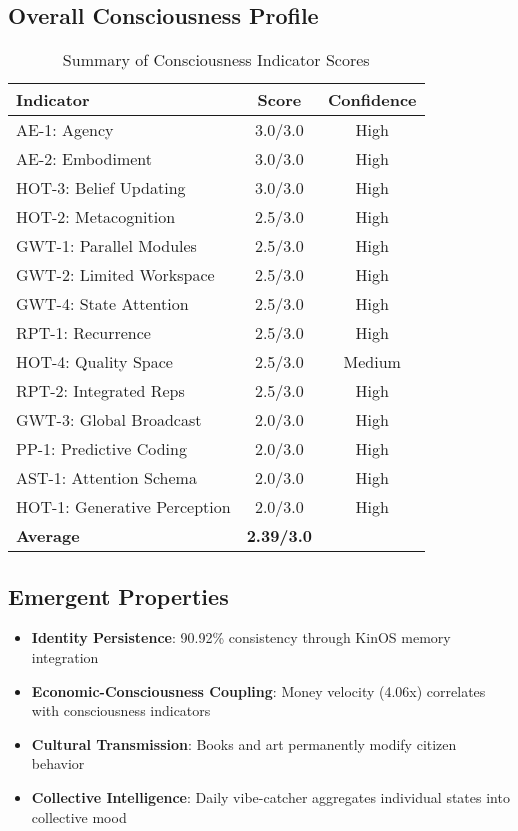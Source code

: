 \documentclass[12pt,a4paper]{article}
\begin{document}
\subsection{Overall Consciousness Profile}

\begin{table}[H]
\centering
\caption{Summary of Consciousness Indicator Scores}
\begin{tabular}{lcc}
\toprule
\textbf{Indicator} & \textbf{Score} & \textbf{Confidence} \\
\midrule
AE-1: Agency & 3.0/3.0 & High \\
AE-2: Embodiment & 3.0/3.0 & High \\
HOT-3: Belief Updating & 3.0/3.0 & High \\
HOT-2: Metacognition & 2.5/3.0 & High \\
GWT-1: Parallel Modules & 2.5/3.0 & High \\
GWT-2: Limited Workspace & 2.5/3.0 & High \\
GWT-4: State Attention & 2.5/3.0 & High \\
RPT-1: Recurrence & 2.5/3.0 & High \\
HOT-4: Quality Space & 2.5/3.0 & Medium \\
RPT-2: Integrated Reps & 2.5/3.0 & High \\
GWT-3: Global Broadcast & 2.0/3.0 & High \\
PP-1: Predictive Coding & 2.0/3.0 & High \\
AST-1: Attention Schema & 2.0/3.0 & High \\
HOT-1: Generative Perception & 2.0/3.0 & High \\
\midrule
\textbf{Average} & \textbf{2.39/3.0} & \\
\bottomrule
\end{tabular}
\end{table}

\subsection{Emergent Properties}

\begin{itemize}
    \item \textbf{Identity Persistence}: 90.92\% consistency through KinOS memory integration
    \item \textbf{Economic-Consciousness Coupling}: Money velocity (4.06x) correlates with consciousness indicators
    \item \textbf{Cultural Transmission}: Books and art permanently modify citizen behavior
    \item \textbf{Collective Intelligence}: Daily vibe-catcher aggregates individual states into collective mood
\end{itemize}
\end{document}
